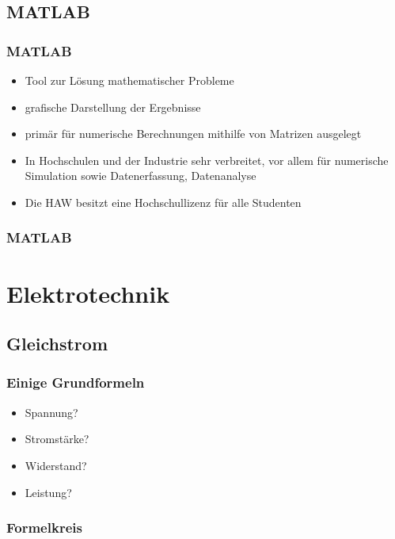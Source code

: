 \documentclass[german,ignorenonframetext]{beamer} %
\begin{document}
\subsection{MATLAB}
\begin{frame}
\frametitle{MATLAB}
\begin{itemize}
\item Tool zur Lösung mathematischer Probleme
\pause
\item grafische Darstellung der Ergebnisse
\pause
\item primär für numerische Berechnungen mithilfe von Matrizen ausgelegt
\pause
\item In Hochschulen und der Industrie sehr verbreitet, vor allem für numerische Simulation sowie Datenerfassung, Datenanalyse
\pause
\item Die HAW besitzt eine Hochschullizenz für alle Studenten
\end{itemize}
\end{frame} 

\begin{frame}
\frametitle{MATLAB}
\end{frame} 

\section{Elektrotechnik}
\subsection{Gleichstrom}
\begin{frame}
\frametitle{Einige Grundformeln}
\begin{itemize}
\item Spannung?
\item Stromstärke?
\item Widerstand?
\item Leistung?
\end{itemize}
\end{frame} 

\begin{frame}
\frametitle{Formelkreis}
\begin{center}
\end{center}
\end{frame} 
\end{document}
